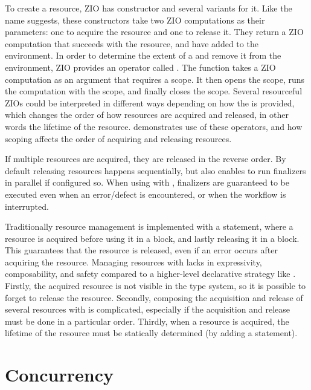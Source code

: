 To create a resource, ZIO has  constructor and several variants for it. Like the name suggests, these constructors take two ZIO computations as their parameters: one to acquire the resource and one to release it. They return a ZIO computation that succeeds with the resource, and have added  to the environment. In order to determine the extent of a  and remove it from the environment, ZIO provides an operator called . The function takes a ZIO computation as an argument that requires a scope. It then opens the scope, runs the computation with the scope, and finally closes the scope. Several resourceful ZIOs could be interpreted in different ways depending on how the  is provided, which changes the order of how resources are acquired and released, in other words the lifetime of the resource.  demonstrates use of these operators, and how scoping affects the order of acquiring and releasing resources.



If multiple resources are acquired, they are released in the reverse order. By default releasing resources happens sequentially, but  also enables to run finalizers in parallel if configured so. When using  with , finalizers are guaranteed to be executed even when an error/defect is encountered, or when the workflow is interrupted.

Traditionally resource management is implemented with a  statement, where a resource is acquired before using it in a  block, and lastly releasing it in a  block. This guarantees that the resource is released, even if an error occurs after acquiring the resource. Managing resources with  lacks in expressivity, composability, and safety compared to a higher-level declarative strategy like . Firstly, the acquired resource is not visible in the type system, so it is possible to forget to release the resource. Secondly, composing the acquisition and release of several resources with  is complicated, especially if the acquisition and release must be done in a particular order. Thirdly, when a resource is acquired, the lifetime of the resource must be statically determined (by adding a  statement).


\section{Concurrency}

